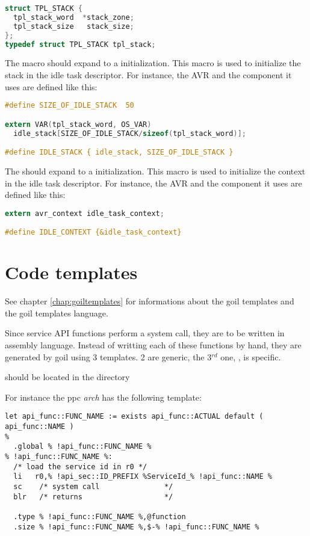 \begin{lstlisting}[language=C]
struct TPL_STACK {
  tpl_stack_word  *stack_zone;
  tpl_stack_size   stack_size; 
};
typedef struct TPL_STACK tpl_stack;
\end{lstlisting}

The  macro should expand to a  initialization. This macro is used to initialize the stack in the idle task descriptor. For instance, the AVR  and the component it uses are defined like this:

\begin{lstlisting}[language=C]
#define SIZE_OF_IDLE_STACK  50

extern VAR(tpl_stack_word, OS_VAR)
  idle_stack[SIZE_OF_IDLE_STACK/sizeof(tpl_stack_word)];

#define IDLE_STACK { idle_stack, SIZE_OF_IDLE_STACK }
\end{lstlisting}

The  should expand to a  initialization. This macro is used to initialize the context in the idle task descriptor.  For instance, the AVR  and the component it uses are defined like this:

\begin{lstlisting}[language=C]
extern avr_context idle_task_context;

#define IDLE_CONTEXT {&idle_task_context} 
\end{lstlisting}

\section{Code templates}

See chapter \ref{chap:goiltemplates} for informations about the goil templates and the goil templates language.

Since service API functions perform a system call, they are to be written in assembly language. Instead of writting each of these functions by hand, they are generated by goil using 3 templates. 2 are generic, the 3$^{rd}$ one, , is specific.

 should be located in the  directory

For instance the ppc {\em arch} has the following template:

\begin{lstlisting}[language=goilTemplate]
let api_func::FUNC_NAME := exists api_func::ACTUAL default ( api_func::NAME )
%
  .global % !api_func::FUNC_NAME %
% !api_func::FUNC_NAME %:
  /* load the service id in r0 */
  li   r0,% !api_sec::ID_PREFIX %ServiceId_% !api_func::NAME %
  sc    /* system call               */
  blr   /* returns                   */
  
  .type % !api_func::FUNC_NAME %,@function
  .size % !api_func::FUNC_NAME %,$-% !api_func::FUNC_NAME %

\end{lstlisting}

